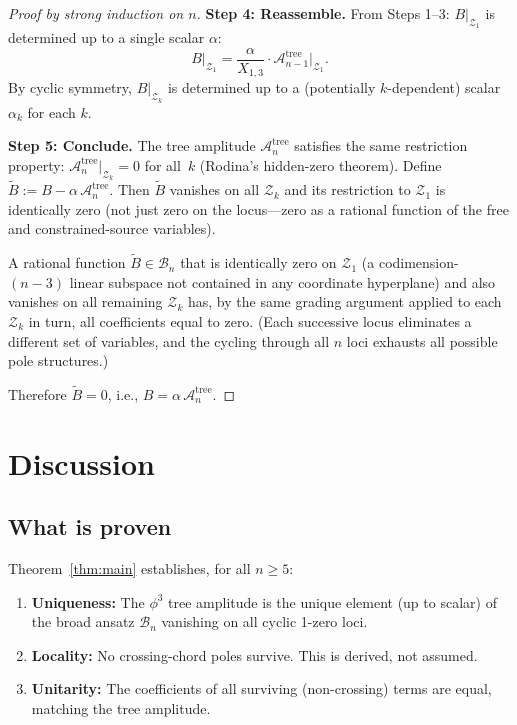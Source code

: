 \documentclass[11pt]{article}
\theoremstyle{plain}
\theoremstyle{definition}
\newcommand{\cA}{\mathcal{A}}
\newcommand{\cB}{\mathcal{B}}
\newcommand{\cZ}{\mathcal{Z}}
\begin{document}
\begin{proof}[Proof by strong induction on $n$]
\medskip\noindent\textbf{Step 4: Reassemble.}
From Steps 1--3: $B|_{\cZ_1}$ is determined up to a single scalar
$\alpha$:
\[
B\big|_{\cZ_1} = \frac{\alpha}{X_{1,3}}\cdot
\cA_{n-1}^{\mathrm{tree}}\big|_{\cZ_1}.
\]
By cyclic symmetry, $B|_{\cZ_k}$ is determined up to a (potentially
$k$-dependent) scalar $\alpha_k$ for each $k$.

\medskip\noindent\textbf{Step 5: Conclude.}
The tree amplitude $\cA_n^{\mathrm{tree}}$ satisfies the same
restriction property: $\cA_n^{\mathrm{tree}}|_{\cZ_k}=0$ for
all~$k$ (Rodina's hidden-zero theorem). Define
$\widetilde{B} := B - \alpha\,\cA_n^{\mathrm{tree}}$. Then
$\widetilde{B}$ vanishes on all $\cZ_k$ and its restriction to
$\cZ_1$ is identically zero (not just zero on the locus---zero
as a rational function of the free and constrained-source variables).

A rational function $\widetilde{B}\in\cB_n$ that is identically zero
on $\cZ_1$ (a codimension-$(n{-}3)$ linear subspace not contained in
any coordinate hyperplane) and also vanishes on all remaining
$\cZ_k$ has, by the same grading argument applied to each $\cZ_k$
in turn, all coefficients equal to zero. (Each successive locus
eliminates a different set of variables, and the cycling through
all $n$ loci exhausts all possible pole structures.)

Therefore $\widetilde{B}=0$, i.e., $B = \alpha\,\cA_n^{\mathrm{tree}}$.
\end{proof}

\section{Discussion}

\subsection{What is proven}

Theorem~\ref{thm:main} establishes, for all $n\geq 5$:
\begin{enumerate}[nosep]
\item \textbf{Uniqueness:} The $\phi^3$ tree amplitude is the
      unique element (up to scalar) of the broad ansatz $\cB_n$
      vanishing on all cyclic 1-zero loci.
\item \textbf{Locality:} No crossing-chord poles survive. This is
      derived, not assumed.
\item \textbf{Unitarity:} The coefficients of all surviving
      (non-crossing) terms are equal, matching the tree amplitude.
\end{enumerate}
\end{document}
